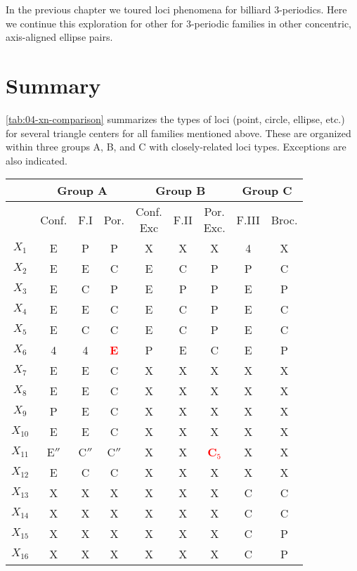 In the previous chapter we toured loci phenomena for billiard 3-periodics. Here we continue this exploration for other for 3-periodic families in other concentric, axis-aligned ellipse pairs.

\section{Summary}

\cref{tab:04-xn-comparison} summarizes the types of loci (point, circle, ellipse, etc.) for several triangle centers for all families mentioned above. These are organized within three groups A, B, and C with closely-related loci types. Exceptions are also indicated.

\begin{table}
\small
\centering
\begin{tabular}{|c||c|c|c||c|c|c||c|c||}
\hline
& \multicolumn{3}{c||}{Group A} & \multicolumn{3}{c||}{Group B} & \multicolumn{2}{c||}{Group C} \\
\hline
 & Conf. & F.I & Por. & \makecell{Conf.\\Exc} & F.II &  \makecell{Por.\\Exc.} & F.III & Broc. \\
 \hline
$X_1$ & E & P & P & X&X & X & 4 & X \\
$X_2$ & E & E & C & E&C & P & P & C \\
$X_3$ & E & C & P & E&P & P & E & P \\
$X_4$ & E & E & C & E&C & P & E & C \\
$X_5$ & E & C & C & E&C & P & E & C \\
$X_6$ & 4 & 4 & \textcolor{red}{\textbf{E}} & P&E & C & E & P \\
$X_7$ & E & E & C & X & X & X & X & X \\
$X_8$ & E & E & C & X & X & X & X & X \\
$X_9$ & P & E & C & X & X & X & X & X \\
$X_{10}$ & E & E & C & X & X & X & X & X \\
$X_{11}$ & E$''$ & C$''$ & C$''$ & X & X & \textcolor{red}{\textbf{C$_5$}} & X & X \\
$X_{12}$ & E & C & C & X & X & X & X & X \\
$X_{13}$ & X & X & X & X & X & X & C & C \\
$X_{14}$ & X & X & X & X & X & X & C & C \\
$X_{15}$ & X & X & X & X & X & X & C & P \\
$X_{16}$ & X & X & X & X & X & X & C & P \\

\end{tabular}
\end{table}
